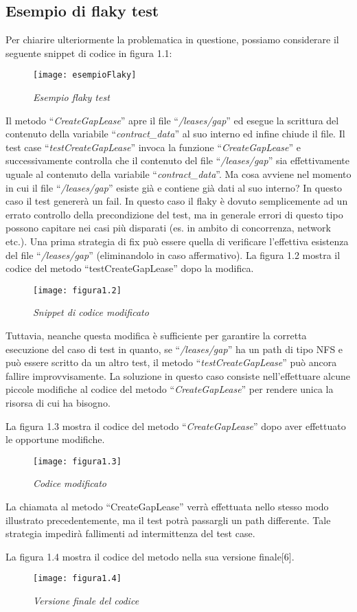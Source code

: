 \subsection{Esempio di flaky test}

Per chiarire ulteriormente la problematica in questione, possiamo considerare il seguente snippet di codice in figura 1.1:
\begin{figure}[h]
	\centering
	\texttt{[image: esempioFlaky]}
	\caption{\emph{Esempio flaky test}}
	\label{fig:mesh1}
\end{figure}

Il metodo “\emph{CreateGapLease}” apre il file “\emph{/leases/gap}” ed esegue la scrittura del contenuto della variabile “\emph{contract\_data}” al suo interno ed infine chiude il file.
Il test case “\emph{testCreateGapLease}” invoca la funzione “\emph{CreateGapLease}” e successivamente controlla che il contenuto del file “\emph{/leases/gap}” sia effettivamente
uguale al contenuto della variabile “\emph{contract\_data}”.
Ma cosa avviene nel momento in cui il file “\emph{/leases/gap}” esiste già e contiene già dati al suo interno? In questo caso il test genererà un fail. In questo caso il flaky
è dovuto semplicemente ad un errato controllo della precondizione del test, ma in generale errori di questo tipo possono capitare nei casi più disparati (es. in ambito di concorrenza, network etc.).
Una prima strategia di fix può essere quella di verificare l’effettiva esistenza del file “\emph{/leases/gap}” (eliminandolo in caso affermativo).
La figura 1.2 mostra il codice del metodo “testCreateGapLease” dopo la modifica.
\begin{figure}[h]
	\centering
	\texttt{[image: figura1.2]}
	\caption{\emph{Snippet di codice modificato}}
	\label{fig:mesh1}
\end{figure}

Tuttavia, neanche questa modifica è sufficiente per garantire la corretta esecuzione del caso di test in quanto, se “\emph{/leases/gap}” ha un path di tipo NFS e può essere scritto da un altro test, il metodo “\emph{testCreateGapLease}” può ancora fallire improvvisamente. La soluzione in questo caso consiste nell’effettuare alcune piccole modifiche al codice del metodo “\emph{CreateGapLease}” per rendere unica la
risorsa di cui ha bisogno.

La figura 1.3 mostra il codice del metodo “\emph{CreateGapLease}” dopo aver effettuato le opportune modifiche.
\newpage
\begin{figure}[h!]
	\centering
	\texttt{[image: figura1.3]}
	\caption{\emph{Codice modificato}}
	\label{fig:mesh1}
\end{figure}

La chiamata al metodo “CreateGapLease” verrà effettuata nello stesso modo illustrato precedentemente, ma il test potrà passargli un path differente. Tale strategia impedirà fallimenti ad intermittenza del test case.

La figura 1.4 mostra il codice del metodo nella sua versione finale[6].
\begin{figure}[h!]
	\centering
	\texttt{[image: figura1.4]}
	\caption{\emph{Versione finale del codice}}
	\label{fig:mesh1}
\end{figure}